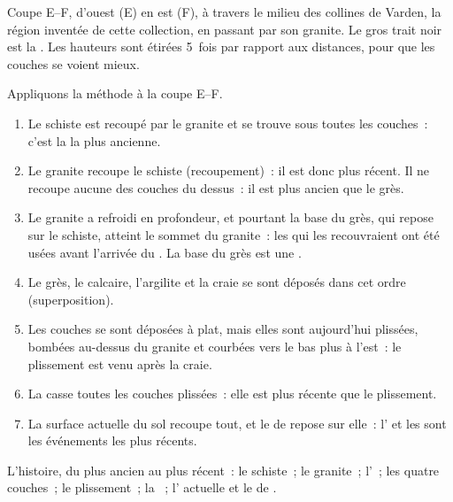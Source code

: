 \begin{omfigure}
\smallskip
{\small Coupe E--F, d'ouest (E) en est (F), à travers le milieu des
collines de Varden, la région inventée de cette collection, en passant par
son granite. Le gros trait noir est la . Les hauteurs sont étirées
5~fois par rapport aux distances, pour que les couches se voient mieux.}
\label{fig:g7:geological-time:section}
\end{omfigure}

\begin{example}\label{ex:g7:geological-time:varden}
Appliquons la méthode à la coupe E--F.
\begin{enumerate}
  \item Le schiste est recoupé par le granite et se trouve sous toutes les
        couches~: c'est la  la plus ancienne.
  \item Le granite recoupe le schiste (recoupement)~: il est donc plus
        récent. Il ne recoupe aucune des couches du dessus~: il est plus
        ancien que le grès.
  \item Le granite a refroidi en profondeur, et pourtant la base du grès,
        qui repose sur le schiste, atteint le sommet du granite~: les
         qui les recouvraient ont été usées avant l'arrivée du
        . La base du grès est une .
  \item Le grès, le calcaire, l'argilite et la craie se sont déposés dans
        cet ordre (superposition).
  \item Les couches se sont déposées à plat, mais elles sont aujourd'hui
        plissées, bombées au-dessus du granite et courbées vers le bas plus
        à l'est~: le plissement est venu après la craie.
  \item La  casse toutes les couches plissées~: elle est plus
        récente que le plissement.
  \item La surface actuelle du sol recoupe tout, et le  de 
        repose sur elle~: l' et les  sont les événements les
        plus récents.
\end{enumerate}
L'histoire, du plus ancien au plus récent~: le schiste~; le granite~;
l'~; les quatre couches~; le plissement~; la ~; l'
actuelle et le  de .
\end{example}

